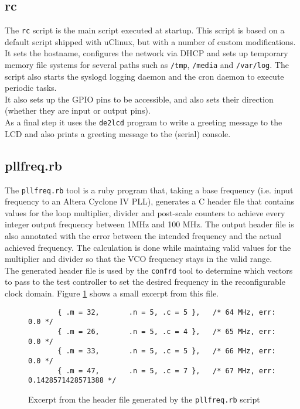 \subsection{rc}
The \texttt{rc} script is the main script executed at startup. This script is based
on a default script shipped with uClinux, but with a number of custom modifications.
\\
 
It sets the hostname, configures the network via DHCP and sets up temporary memory file
systems for several paths such as \texttt{/tmp}, \texttt{/media} and \texttt{/var/log}. The
script also starts the syslogd logging daemon and the cron daemon to execute periodic tasks.
\\

It also sets up the GPIO pins to be accessible, and also sets their direction (whether
they are input or output pins).
\\

As a final step it uses the \texttt{de2lcd} program to write a greeting message to the LCD
and also prints a greeting message to the (serial) console.


\subsection{pllfreq.rb}
The \texttt{pllfreq.rb} tool is a ruby program that, taking a base frequency (i.e. input
frequency to an Altera Cyclone IV PLL), generates a C header file that contains values
for the loop multiplier, divider and post-scale counters to achieve every integer
output frequency between 1MHz and 100 MHz. The output header file is also annotated with the
error between the intended frequency and the actual achieved frequency. The calculation
is done while maintaing valid values for the multiplier and divider so that the VCO
frequency stays in the valid range.
\\

The generated header file is used by the \texttt{confrd} tool to determine which vectors
to pass to the test controller to set the desired frequency in the reconfigurable
clock domain. Figure \ref{listing:pllfreq_h} shows a small excerpt from this file.

\begin{figure}[h!]
\lstset{basicstyle=\scriptsize\ttfamily}
\begin{lstlisting}
       { .m = 32,       .n = 5, .c = 5 },   /* 64 MHz, err: 0.0 */
       { .m = 26,       .n = 5, .c = 4 },   /* 65 MHz, err: 0.0 */
       { .m = 33,       .n = 5, .c = 5 },   /* 66 MHz, err: 0.0 */
       { .m = 47,       .n = 5, .c = 7 },   /* 67 MHz, err: 0.1428571428571388 */
\end{lstlisting}
\caption{Excerpt from the header file generated by the \texttt{pllfreq.rb} script}
\label{listing:pllfreq_h}
\end{figure}